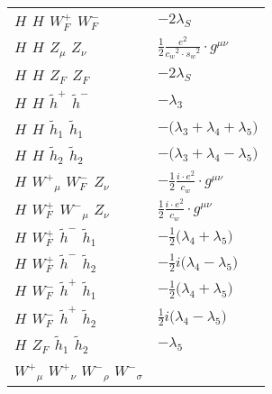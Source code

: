 \begin{center}
\begin{tabular}{|l|l|}
${H}_{}$ \phantom{-} ${H}_{}$ \phantom{-} $W^+_F{}_{}$ \phantom{-} $W^-_F{}_{}$ \phantom{-}  &
	$-2 \lambda_S$\\[2mm]
${H}_{}$ \phantom{-} ${H}_{}$ \phantom{-} ${Z}_{\mu }$ \phantom{-} ${Z}_{\nu }$ \phantom{-}  &
	$\frac{1}{2}\frac{ e{}^2 }{ c_w{}^2  \cdot s_w{}^2 }\cdot g^{\mu \nu} $\\[2mm]
${H}_{}$ \phantom{-} ${H}_{}$ \phantom{-} $Z_F{}_{}$ \phantom{-} $Z_F{}_{}$ \phantom{-}  &
	$-2 \lambda_S$\\[2mm]
${H}_{}$ \phantom{-} ${H}_{}$ \phantom{-} $\widetilde{h}^+{}_{}$ \phantom{-} $\widetilde{h}^-{}_{}$ \phantom{-}  &
	$- \lambda_3$\\[2mm]
${H}_{}$ \phantom{-} ${H}_{}$ \phantom{-} $\widetilde{h}_1{}_{}$ \phantom{-} $\widetilde{h}_1{}_{}$ \phantom{-}  &
	$-\big( \lambda_3+ \lambda_4+ \lambda_5\big)$\\[2mm]
${H}_{}$ \phantom{-} ${H}_{}$ \phantom{-} $\widetilde{h}_2{}_{}$ \phantom{-} $\widetilde{h}_2{}_{}$ \phantom{-}  &
	$-\big( \lambda_3+ \lambda_4- \lambda_5\big)$\\[2mm]
${H}_{}$ \phantom{-} $W^+{}_{\mu }$ \phantom{-} $W^-_F{}_{}$ \phantom{-} ${Z}_{\nu }$ \phantom{-}  &
	$-\frac{1}{2}\frac{ i \cdot e{}^2 }{ c_w}\cdot g^{\mu \nu} $\\[2mm]
${H}_{}$ \phantom{-} $W^+_F{}_{}$ \phantom{-} $W^-{}_{\mu }$ \phantom{-} ${Z}_{\nu }$ \phantom{-}  &
	$\frac{1}{2}\frac{ i \cdot e{}^2 }{ c_w}\cdot g^{\mu \nu} $\\[2mm]
${H}_{}$ \phantom{-} $W^+_F{}_{}$ \phantom{-} $\widetilde{h}^-{}_{}$ \phantom{-} $\widetilde{h}_1{}_{}$ \phantom{-}  &
	$-\frac{1}{2}\big( \lambda_4+ \lambda_5\big)$\\[2mm]
${H}_{}$ \phantom{-} $W^+_F{}_{}$ \phantom{-} $\widetilde{h}^-{}_{}$ \phantom{-} $\widetilde{h}_2{}_{}$ \phantom{-}  &
	$-\frac{1}{2} i\big( \lambda_4- \lambda_5\big)$\\[2mm]
${H}_{}$ \phantom{-} $W^-_F{}_{}$ \phantom{-} $\widetilde{h}^+{}_{}$ \phantom{-} $\widetilde{h}_1{}_{}$ \phantom{-}  &
	$-\frac{1}{2}\big( \lambda_4+ \lambda_5\big)$\\[2mm]
${H}_{}$ \phantom{-} $W^-_F{}_{}$ \phantom{-} $\widetilde{h}^+{}_{}$ \phantom{-} $\widetilde{h}_2{}_{}$ \phantom{-}  &
	$\frac{1}{2} i\big( \lambda_4- \lambda_5\big)$\\[2mm]
${H}_{}$ \phantom{-} $Z_F{}_{}$ \phantom{-} $\widetilde{h}_1{}_{}$ \phantom{-} $\widetilde{h}_2{}_{}$ \phantom{-}  &
	$- \lambda_5$\\[2mm]
$W^+{}_{\mu }$ \phantom{-} $W^+{}_{\nu }$ \phantom{-} $W^-{}_{\rho }$ \phantom{-} $W^-{}_{\sigma }$ \phantom{-}  &

\end{tabular}
\end{center}
